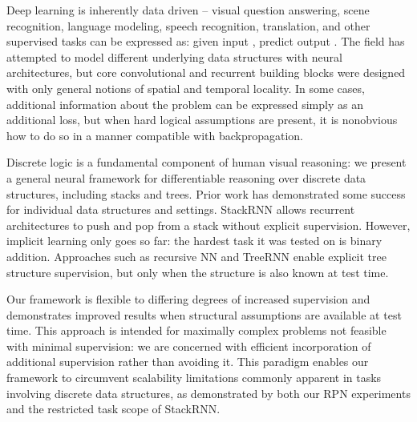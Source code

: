 \documentclass{article}
\begin{document}
Deep learning is inherently data driven -- visual question answering, scene recognition, language modeling, speech recognition, translation, and other supervised tasks can be expressed as: given input , predict output .
The field has attempted to model different underlying data structures with neural architectures, but core convolutional and recurrent building blocks were designed with only general notions of spatial and temporal locality. In some cases, additional information about the problem can be expressed simply as an additional loss, but when hard logical assumptions are present, it is nonobvious how to do so in a manner compatible with backpropagation.

Discrete logic is a fundamental component of human visual reasoning: we present a general neural framework for differentiable reasoning over discrete data structures, including stacks and trees. Prior work has demonstrated some success for individual data structures and settings. StackRNN \cite{DBLP:journals/corr/JoulinM15} allows recurrent architectures to push and pop from a stack without explicit supervision. However, implicit learning only goes so far: the hardest task it was tested on is binary addition. Approaches such as recursive NN \cite{SocherEtAl2011:RNN} and TreeRNN \cite{DBLP:journals/corr/TaiSM15} enable explicit tree structure supervision, but only when the structure is also known at test time.

Our framework is flexible to differing degrees of increased supervision and demonstrates improved results when structural assumptions are available at test time. This approach is intended for maximally complex problems not feasible with minimal supervision: we are concerned with efficient incorporation of additional supervision rather than avoiding it. This paradigm enables our framework to circumvent scalability limitations commonly apparent in tasks involving discrete data structures, as demonstrated by both our RPN experiments and the restricted task scope of StackRNN.
\end{document}
